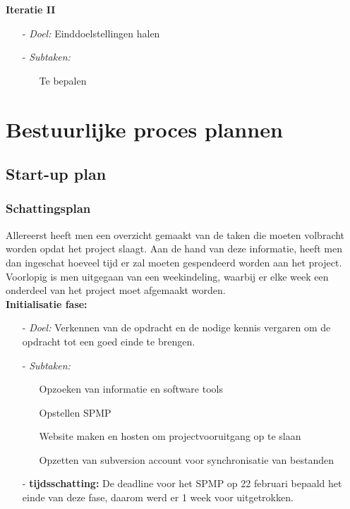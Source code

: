 \documentclass{article}
\begin{document}
\textbf{\large Iteratie II}
\begin{itemize}
\item[-] \textit{Doel:} Einddoelstellingen halen\\[-5mm]
\item[-] \textit{Subtaken:}\\[-5mm]
\begin{itemize}
	\item[] Te bepalen \\[-5mm]
\end{itemize}
\end{itemize}


\newpage
\section{Bestuurlijke proces plannen}


\subsection{Start-up plan}

\subsubsection{Schattingsplan}

Allereerst heeft men een overzicht gemaakt van de taken die moeten volbracht worden opdat het project slaagt. Aan de hand van deze informatie, heeft men dan ingeschat hoeveel tijd er zal moeten gespendeerd worden aan het project. Voorlopig is men uitgegaan van een weekindeling, waarbij er elke week een onderdeel van het project moet afgemaakt worden. \\[3mm]

\textbf{Initialisatie fase:}
\begin{itemize}
\item[-] \textit{Doel:} Verkennen van de opdracht en de nodige kennis vergaren om de opdracht tot een goed einde te brengen. \\[-5mm]
\item[-] \textit{Subtaken:}\\[-5mm]
\begin{itemize}
	\item[] Opzoeken van informatie en software tools\\[-5mm]
	\item[] Opstellen SPMP\\[-5mm]
	\item[] Website maken en hosten om projectvooruitgang op te slaan\\[-5mm]
	\item[] Opzetten van subversion account voor synchronisatie van bestanden \\[-5mm]
\end{itemize}
\item[-] \textbf{tijdsschatting:} De deadline voor het SPMP op 22 februari bepaald het einde van deze fase, daarom werd er 1 week voor uitgetrokken.\\[-5mm]
\end{itemize}
\end{document}
